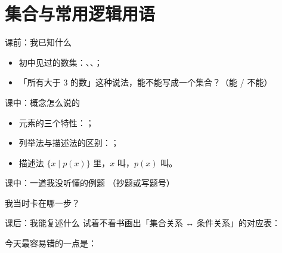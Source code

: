\section{集合与常用逻辑用语}

\begin{notezone}{课前：我已知什么}
\begin{itemize}
  \item 初中见过的数集：\underline{\hspace{4em}}、\underline{\hspace{4em}}、\underline{\hspace{4em}}；
  \item 「所有大于 3 的数」这种说法，能不能写成一个集合？\hspace{2em}（能 / 不能）
\end{itemize}
\noteblank[10ex]
\end{notezone}

\begin{notezone}{课中：概念怎么说的}
\begin{itemize}
  \item 元素的三个特性：\hspace{8em}；
  \item 列举法与描述法的区别：\hspace{8em}；
  \item 描述法 $\{x\mid p(x)\}$ 里，$x$ 叫\hspace{4em}，$p(x)$ 叫\hspace{4em}。
\end{itemize}
\noteblank[14ex]
\end{notezone}

\begin{notezone}{课中：一道我没听懂的例题}
（抄题或写题号）

\noteblank[16ex]

我当时卡在哪一步？

\noteblank[10ex]
\end{notezone}

\begin{notezone}{课后：我能复述什么}
试着不看书画出「集合关系 ↔ 条件关系」的对应表：

\noteblank[18ex]

今天最容易错的一点是：

\noteblank[8ex]
\end{notezone}
